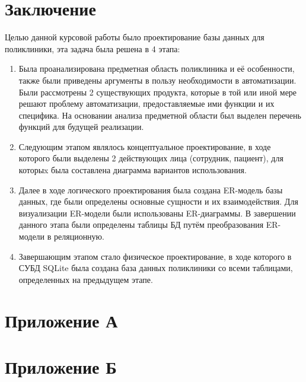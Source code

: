 \documentclass[14pt,a4paper,russian]{extreport}
\begin{document}
\chapter*{Заключение}
Целью данной курсовой работы было проектирование базы данных для поликлиники, эта задача
была решена в 4 этапа:
\begin{enumerate}[noitemsep]
    \item Была проанализирована предметная область поликлиника и её особенности, также были
        приведены аргументы в пользу необходимости в автоматизации. Были рассмотрены 2 существующих
        продукта, которые в той или иной мере решают проблему автоматизации, предоставляемые ими
        функции и их специфика. На основании анализа предметной области был выделен перечень
        функций для будущей реализации.
    \item Следующим этапом являлось концептуальное проектирование, в ходе которого были выделены 2
        действующих лица (сотрудник, пациент), для которыx была составлена
        диаграмма вариантов использования.
    \item Далее в ходе логического проектирования была создана ER-модель базы данных, где были
        определены основные сущности и их взаимодействия. Для визуализации ER-модели были
        использованы ER-диаграммы. В завершении данного этапа были определены таблицы БД путём
        преобразования ER-модели в реляционную.
    \item Завершающим этапом стало физическое проектирование, в ходе которого в СУБД SQLite была
        создана база данных поликлиники со всеми таблицами, определенных на предыдущем этапе.
\end{enumerate}

{}

\chapter*{Приложение А}
\setcounter{lstlisting}{0}








\newpage



\newpage




\chapter*{Приложение Б}
\end{document}
